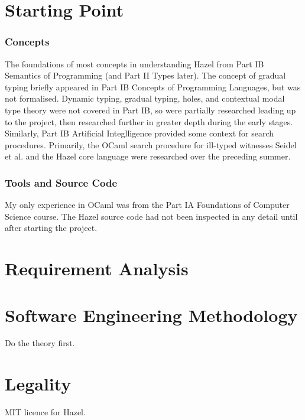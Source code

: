 \section{Starting Point}\label{sec:StartingPoint}
\subsubsection{Concepts}
The foundations of most concepts in understanding Hazel from Part IB Semantics of Programming (and Part II Types later). The concept of gradual typing briefly appeared in Part IB Concepts of Programming Languages, but was not formalised. Dynamic typing, gradual typing, holes, and contextual modal type theory were not covered in Part IB, so were partially researched leading up to the project, then researched further in greater depth during the early stages. Similarly, Part IB Artificial Integlligence provided some context for search procedures. Primarily, the OCaml search procedure for ill-typed witnesses Seidel et al. \cite{SearchProc} and the Hazel core language \cite{HazelLivePaper} were researched over the preceding summer.

\subsubsection{Tools and Source Code}
My only experience in OCaml was from the Part IA Foundations of Computer Science course. The Hazel source code had not been inspected in any detail until after starting the project.

\section{Requirement Analysis}\label{sec:RequirementAnalysis}

\section{Software Engineering Methodology}\label{sec:EngineeringMethodology}
Do the theory first.

\section{Legality}\label{sec:Legality}
MIT licence for Hazel.